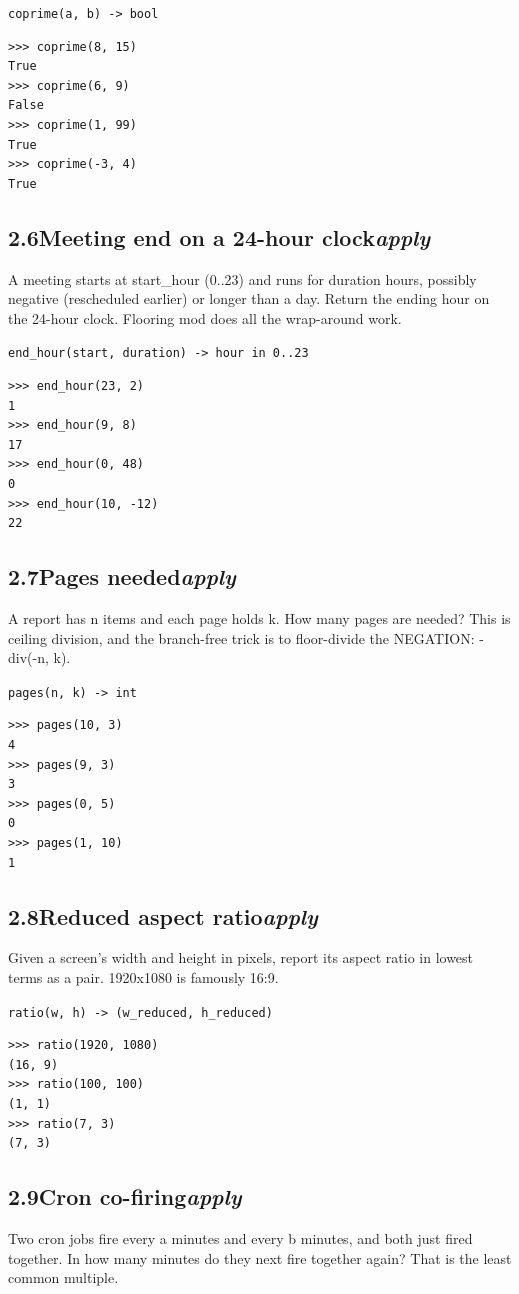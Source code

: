 \documentclass[10pt,letterpaper]{book}
\begin{document}
\noindent\texttt{coprime(a, b) -> bool}
\begin{lstlisting}[style=ex]
>>> coprime(8, 15)
True
>>> coprime(6, 9)
False
>>> coprime(1, 99)
True
>>> coprime(-3, 4)
True
\end{lstlisting}
\subsection*{2.6\quad Meeting end on a 24-hour clock\hfill\textnormal{\textit{apply}}}
A meeting starts at start\_hour (0..23) and runs for duration hours, possibly negative (rescheduled earlier) or longer than a day. Return the ending hour on the 24-hour clock. Flooring mod does all the wrap-around work.

\noindent\texttt{end\_hour(start, duration) -> hour in 0..23}
\begin{lstlisting}[style=ex]
>>> end_hour(23, 2)
1
>>> end_hour(9, 8)
17
>>> end_hour(0, 48)
0
>>> end_hour(10, -12)
22
\end{lstlisting}
\subsection*{2.7\quad Pages needed\hfill\textnormal{\textit{apply}}}
A report has n items and each page holds k. How many pages are needed? This is ceiling division, and the branch-free trick is to floor-divide the NEGATION: -div(-n, k).

\noindent\texttt{pages(n, k) -> int}
\begin{lstlisting}[style=ex]
>>> pages(10, 3)
4
>>> pages(9, 3)
3
>>> pages(0, 5)
0
>>> pages(1, 10)
1
\end{lstlisting}
\subsection*{2.8\quad Reduced aspect ratio\hfill\textnormal{\textit{apply}}}
Given a screen's width and height in pixels, report its aspect ratio in lowest terms as a pair. 1920x1080 is famously 16:9.

\noindent\texttt{ratio(w, h) -> (w\_reduced, h\_reduced)}
\begin{lstlisting}[style=ex]
>>> ratio(1920, 1080)
(16, 9)
>>> ratio(100, 100)
(1, 1)
>>> ratio(7, 3)
(7, 3)
\end{lstlisting}
\subsection*{2.9\quad Cron co-firing\hfill\textnormal{\textit{apply}}}
Two cron jobs fire every a minutes and every b minutes, and both just fired together. In how many minutes do they next fire together again? That is the least common multiple.
\end{document}
